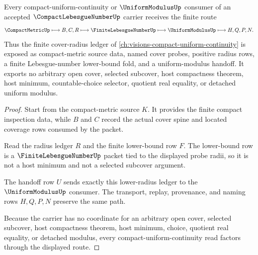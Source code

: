 \begin{theorem}
\label{thm:compact-lebesgue-number-uniform-modulus-handoff}
Every compact-uniform-continuity or $\UniformModulusUp$ consumer of an accepted $\CompactLebesgueNumberUp$ carrier receives the finite route
$$
\CompactMetricUp
\longmapsto
B,C,R
\longmapsto
\FiniteLebesgueNumberUp
\longmapsto
\UniformModulusUp
\longmapsto
H,Q,P,N .
$$
Thus the finite cover-radius ledger of \autoref{ch:visions-compact-uniform-continuity} is exposed as compact-metric source data, named cover probes, positive radius rows, a finite Lebesgue-number lower-bound fold, and a uniform-modulus handoff. It exports no arbitrary open cover, selected subcover, host compactness theorem, host minimum, countable-choice selector, quotient real equality, or detached uniform modulus.
\end{theorem}
\begin{proof}
Start from the compact-metric source $K$. It provides the finite compact inspection data, while $B$ and $C$ record the actual cover spine and located coverage rows consumed by the packet.

Read the radius ledger $R$ and the finite lower-bound row $F$. The lower-bound row is a $\FiniteLebesgueNumberUp$ packet tied to the displayed probe radii, so it is not a host minimum and not a selected subcover argument.

The handoff row $U$ sends exactly this lower-radius ledger to the $\UniformModulusUp$ consumer. The transport, replay, provenance, and naming rows $H,Q,P,N$ preserve the same path.

Because the carrier has no coordinate for an arbitrary open cover, selected subcover, host compactness theorem, host minimum, choice, quotient real equality, or detached modulus, every compact-uniform-continuity read factors through the displayed route.
\end{proof}

